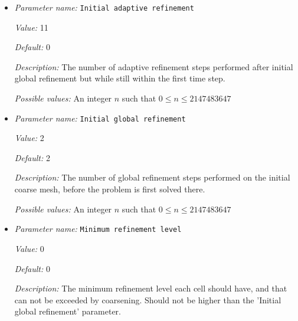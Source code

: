 \begin{itemize}
{\it Value:} 0.0


{\it Default:} 0.05


{\it Description:} The fraction of cells with the smallest error that should be flagged for coarsening.


{\it Possible values:} A floating point number $v$ such that $0 \leq v \leq 1$
\item {\it Parameter name:} {\tt Initial adaptive refinement}
\label{parameters:Mesh refinement/Initial adaptive refinement}
\label{parameters:Mesh_20refinement/Initial_20adaptive_20refinement}


{\it Value:} 11


{\it Default:} 0


{\it Description:} The number of adaptive refinement steps performed after initial global refinement but while still within the first time step.


{\it Possible values:} An integer $n$ such that $0\leq n \leq 2147483647$
\item {\it Parameter name:} {\tt Initial global refinement}
\label{parameters:Mesh refinement/Initial global refinement}
\label{parameters:Mesh_20refinement/Initial_20global_20refinement}


{\it Value:} 2


{\it Default:} 2


{\it Description:} The number of global refinement steps performed on the initial coarse mesh, before the problem is first solved there.


{\it Possible values:} An integer $n$ such that $0\leq n \leq 2147483647$
\item {\it Parameter name:} {\tt Minimum refinement level}
\label{parameters:Mesh refinement/Minimum refinement level}
\label{parameters:Mesh_20refinement/Minimum_20refinement_20level}


{\it Value:} 0


{\it Default:} 0


{\it Description:} The minimum refinement level each cell should have, and that can not be exceeded by coarsening. Should not be higher than the 'Initial global refinement' parameter.



\end{itemize}
